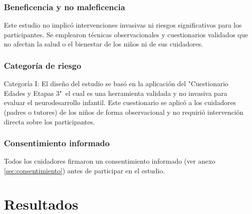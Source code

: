 \documentclass[11pt,letterpaper]{report}
\newcommand{\asq}{"Cuestionario Edades y Etapas 3"}
\begin{document}
\subsection{Beneficencia y no maleficencia}
Este estudio no implicó intervenciones invasivas ni riesgos significativos para
los participantes. Se emplearon técnicas observacionales y cuestionarios
validados que no afectan la salud o el bienestar de los niños ni de sus
cuidadores.

\subsection{Categoría de riesgo}
Categoría I: El diseño del estudio se basó en la aplicación del \asq\ el cual
es una herramienta validada y no invasiva para evaluar el neurodesarrollo
infantil. Este cuestionario se aplicó a los cuidadores (padres o tutores) de
los niños de forma observacional y no requirió intervención directa sobre los
participantes.

\subsection{Consentimiento informado}
Todos los cuidadores firmaron un consentimiento informado (ver anexo
\ref{sec:consentimiento}) antes de participar en el estudio.

\chapter{Resultados}
\end{document}
